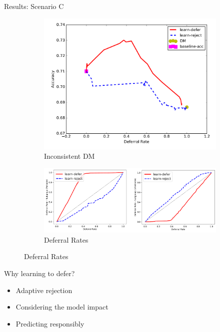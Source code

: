 \documentclass[11pt]{beamer}
\begin{document}
\begin{frame}{Results: Scenario C}
\begin{figure}[t!]
\centering
\begin{subfigure}[t]{0.4\textwidth}
\includegraphics[width=\textwidth]{Figures/compasInconsistent.PNG}
\caption{Inconsistent DM}
\end{subfigure}%
\begin{subfigure}[t]{0.6\textwidth}
\includegraphics[width=\textwidth]{Figures/compasDeferralRatesC.PNG}
\caption{Deferral Rates}
\end{subfigure}
\end{figure}
\end{frame}

\begin{frame}{Why learning to defer?}
\begin{itemize}
    \item Adaptive rejection
    \item Considering the model impact
    \item Predicting responsibly
\end{itemize}
\end{frame}
\end{document}
